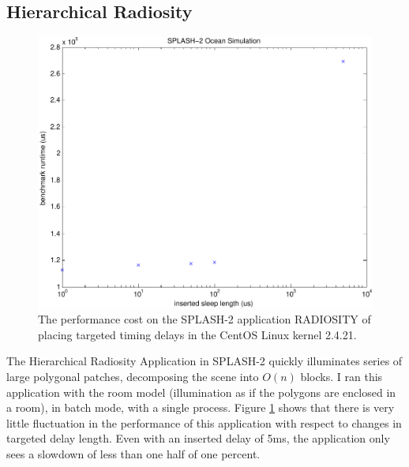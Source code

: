 \documentclass[letterpaper,twocolumn,10pt]{article}
\begin{document}
\subsection{Hierarchical Radiosity}
\begin{figure}
\centering
\includegraphics[width=\columnwidth]{ocean}
\caption{The performance cost on the SPLASH-2 application RADIOSITY of placing targeted timing delays in the CentOS Linux kernel 2.4.21.}
\label{fig_radiosity}
\end{figure}
The Hierarchical Radiosity Application \cite{Hanrahan1991} in SPLASH-2 quickly illuminates series of large polygonal patches, decomposing the scene into $O(n)$ blocks.  I ran this application with the room model (illumination as if the polygons are enclosed in a room), in batch mode, with a single process.  Figure \ref{fig_radiosity} shows that there is very little fluctuation in the performance of this application with respect to changes in targeted delay length.  Even with an inserted delay of 5ms, the application only sees a slowdown of less than one half of one percent.
\end{document}
